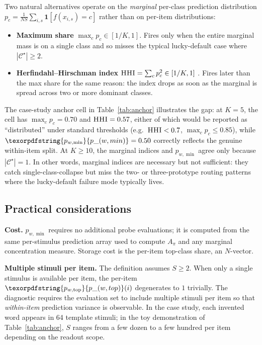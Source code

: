 \documentclass[11pt,letterpaper]{article}
\newcommand{\pwtop}{\texorpdfstring{\ensuremath{p_{w,\text{top}}}}{p\_(w,top)}}
\newcommand{\pwmin}{\texorpdfstring{\ensuremath{p_{w,\min}}}{p\_(w,min)}}
\newcommand{\hhi}{\textsc{HHI}}
\begin{document}
Two natural alternatives operate on the \emph{marginal} per-class
prediction distribution $p_c = \tfrac{1}{NS}
\sum_{i,s} \mathbf{1}[f(x_{i,s}) = c]$ rather than on per-item
distributions:
\begin{itemize}
  \item \textbf{Maximum share} $\max_c p_c \in [1/K, 1]$. Fires
        only when the entire marginal mass is on a single class
        and so misses the typical lucky-default case where
        $|\mathcal{C}^\star| \geq 2$.
  \item \textbf{Herfindahl--Hirschman index}
        $\hhi = \sum_c p_c^2 \in [1/K, 1]$
        \citep{hirschman1964hhi}. Fires later than the max
        share for the same reason: the index drops as soon as
        the marginal is spread across two or more dominant
        classes.
\end{itemize}
The case-study anchor cell in Table~\ref{tab:anchor} illustrates the
gap: at $K = 5$, the cell has $\max_c p_c = 0.70$ and $\hhi = 0.57$,
either of which would be reported as ``distributed'' under standard
thresholds (e.g.\ $\hhi < 0.7$, $\max_c p_c \leq 0.85$), while
$\pwmin = 0.50$ correctly reflects the genuine within-item split.
At $K \geq 10$, the marginal indices and \pwmin{} agree only because
$|\mathcal{C}^\star| = 1$. In other words, marginal indices are
necessary but not sufficient: they catch
single-class-collapse but miss the two- or three-prototype routing
patterns where the lucky-default failure mode typically lives.

\subsection{Practical considerations}

\textbf{Cost.} \pwmin{} requires no additional probe evaluations; it
is computed from the same per-stimulus prediction array used to
compute $A_\pi$ and any marginal concentration measure. Storage cost
is the per-item top-class share, an $N$-vector.

\textbf{Multiple stimuli per item.} The definition assumes $S \geq 2$.
When only a single stimulus is available per item, the per-item
$\pwtop(i)$ degenerates to $1$ trivially. The diagnostic requires the
evaluation set to include multiple stimuli per item so that
\emph{within-item} prediction variance is observable. In the case
study, each invented word appears in 64 template stimuli; in the toy
demonstration of Table~\ref{tab:anchor}, $S$ ranges from a few dozen
to a few hundred per item depending on the readout scope.
\end{document}

